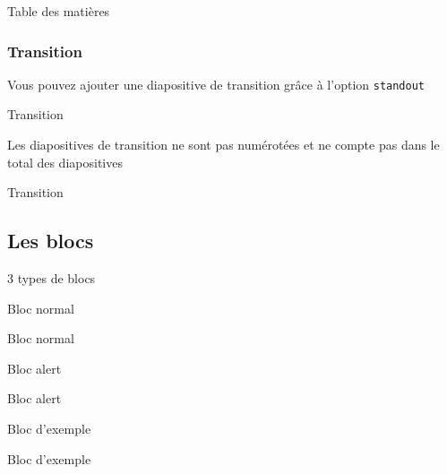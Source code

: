 \documentclass[french]{beamer}
\begin{document}
  \begin{frame}[noframenumbering]{Table des matières}
    \tableofcontents[currentsection]
  \end{frame}
    
  \begin{slide}
    \frametitle{Transition}
    
    \begin{block}{} 
      \begin{code}
      Vous pouvez ajouter une diapositive de transition grâce à l'option \verb:standout:
      \begin{frame}[standout]
        Transition
      \end{frame}
      \end{code}
      Les diapositives de transition ne sont pas numérotées et ne compte pas dans le total des diapositives
    \end{block}
  \end{slide}
  
  \begin{frame}[standout]
    Transition
  \end{frame}
  
  \subsection{Les blocs}
  
  \begin{frame}[fragile]{3 types de blocs}
    \begin{block}{Bloc normal}
      \begin{code}
        \begin{block}{Bloc normal}
        \end{block}
      \end{code}
    \end{block}
    \begin{alertblock}{Bloc alert}
      \begin{code}
        \begin{alertblock}{Bloc alert}
        \end{alertblock}
      \end{code}
    \end{alertblock}
    \begin{exampleblock}{Bloc d'exemple}
      \begin{code}
        \begin{exampleblock}{Bloc d'exemple}
        \end{exampleblock}
      \end{code}
    \end{exampleblock}
  \end{frame}
  
\end{document}
